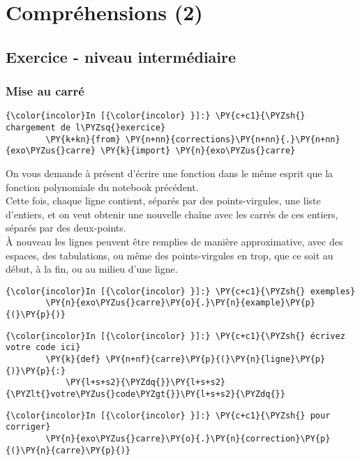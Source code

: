     \hypertarget{compruxe9hensions-2}{%
\section{Compréhensions (2)}\label{compruxe9hensions-2}}

    \hypertarget{exercice---niveau-intermuxe9diaire}{%
\subsection{Exercice - niveau
intermédiaire}\label{exercice---niveau-intermuxe9diaire}}

    \hypertarget{mise-au-carruxe9}{%
\subsubsection{Mise au carré}\label{mise-au-carruxe9}}

    \begin{Verbatim}[commandchars=\\\{\}]
{\color{incolor}In [{\color{incolor} }]:} \PY{c+c1}{\PYZsh{} chargement de l\PYZsq{}exercice}
        \PY{k+kn}{from} \PY{n+nn}{corrections}\PY{n+nn}{.}\PY{n+nn}{exo\PYZus{}carre} \PY{k}{import} \PY{n}{exo\PYZus{}carre}
\end{Verbatim}


    On vous demande à présent d'écrire une fonction dans le même esprit que
la fonction polynomiale du notebook précédent.\\
Cette fois, chaque ligne contient, séparés par des
points-virgules, une liste d'entiers, et on veut obtenir une nouvelle
chaîne avec les carrés de ces entiers, séparés par des deux-points.\\

À nouveau les lignes peuvent être remplies de manière approximative,
avec des espaces, des tabulations, ou même des points-virgules en trop,
que ce soit au début, à la fin, ou au milieu d'une ligne.

    \begin{Verbatim}[commandchars=\\\{\}]
{\color{incolor}In [{\color{incolor} }]:} \PY{c+c1}{\PYZsh{} exemples}
        \PY{n}{exo\PYZus{}carre}\PY{o}{.}\PY{n}{example}\PY{p}{(}\PY{p}{)}
\end{Verbatim}


    \begin{Verbatim}[commandchars=\\\{\}]
{\color{incolor}In [{\color{incolor} }]:} \PY{c+c1}{\PYZsh{} écrivez votre code ici}
        \PY{k}{def} \PY{n+nf}{carre}\PY{p}{(}\PY{n}{ligne}\PY{p}{)}\PY{p}{:}
            \PY{l+s+s2}{\PYZdq{}}\PY{l+s+s2}{\PYZlt{}votre\PYZus{}code\PYZgt{}}\PY{l+s+s2}{\PYZdq{}}
\end{Verbatim}


    \begin{Verbatim}[commandchars=\\\{\}]
{\color{incolor}In [{\color{incolor} }]:} \PY{c+c1}{\PYZsh{} pour corriger}
        \PY{n}{exo\PYZus{}carre}\PY{o}{.}\PY{n}{correction}\PY{p}{(}\PY{n}{carre}\PY{p}{)}
\end{Verbatim}
